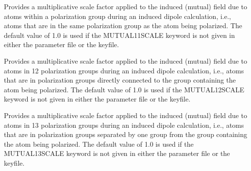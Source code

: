 \documentclass[letterpaper,11pt,english]{sphinxmanual}
\begin{document}
\ignorespaces {}\label{\detokenize{text/keywords:key-mutual-11-scale}}\begin{description}
\sphinxAtStartPar
Provides a multiplicative scale factor applied to the induced (mutual) field due to atoms within a polarization group during an induced dipole calculation, i.e., atoms that are in the same polarization group as the atom being polarized. The default value of 1.0 is used if the MUTUAL\sphinxhyphen{}11\sphinxhyphen{}SCALE keyword is not given in either the parameter file or the keyfile.

\end{description}

\ignorespaces {}\label{\detokenize{text/keywords:key-mutual-12-scale}}\begin{description}
\sphinxAtStartPar
Provides a multiplicative scale factor applied to the induced (mutual) field due to atoms in 1\sphinxhyphen{}2 polarization groups during an induced dipole calculation, i.e., atoms that are in polarization groups directly connected to the group containing the atom being polarized. The default value of 1.0 is used if the MUTUAL\sphinxhyphen{}12\sphinxhyphen{}SCALE keyword is not given in either the parameter file or the keyfile.

\end{description}

\ignorespaces {}\label{\detokenize{text/keywords:key-mutual-13-scale}}\begin{description}
\sphinxAtStartPar
Provides a multiplicative scale factor applied to the induced (mutual) field due to atoms in 1\sphinxhyphen{}3 polarization groups during an induced dipole calculation, i.e., atoms that are in polarization groups separated by one group from the group containing the atom being polarized. The default value of 1.0 is used if the MUTUAL\sphinxhyphen{}13\sphinxhyphen{}SCALE keyword is not given in either the parameter file or the keyfile.

\end{description}
\end{document}
